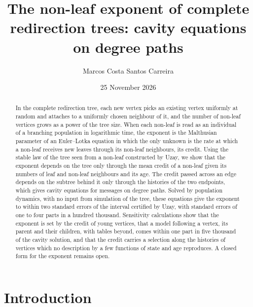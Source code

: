 \documentclass[11pt]{article}
\title{The non-leaf exponent of complete redirection trees: cavity equations on degree paths}
\author{Marcos Costa Santos Carreira}
\date{25 November 2026}
\theoremstyle{plain}
\theoremstyle{definition}
\theoremstyle{remark}
\begin{document}
\maketitle

\begin{abstract}
In the complete redirection tree, each new vertex picks an existing vertex uniformly at random and attaches to a uniformly chosen neighbour of it, and the number of non-leaf vertices grows as a power of the tree size. When each non-leaf is read as an individual of a branching population in logarithmic time, the exponent is the Malthusian parameter of an Euler--Lotka equation in which the only unknown is the rate at which a non-leaf receives new leaves through its non-leaf neighbours, its credit. Using the stable law of the tree seen from a non-leaf constructed by Uzay, we show that the exponent depends on the tree only through the mean credit of a non-leaf given its numbers of leaf and non-leaf neighbours and its age. The credit passed across an edge depends on the subtree behind it only through the histories of the two endpoints, which gives cavity equations for messages on degree paths. Solved by population dynamics, with no input from simulation of the tree, these equations give the exponent to within two standard errors of the interval certified by Uzay, with standard errors of one to four parts in a hundred thousand. Sensitivity calculations show that the exponent is set by the credit of young vertices, that a model following a vertex, its parent and their children, with tables beyond, comes within one part in five thousand of the cavity solution, and that the credit carries a selection along the histories of vertices which no description by a few functions of state and age reproduces. A closed form for the exponent remains open.
\end{abstract}

\section{Introduction}
\end{document}
